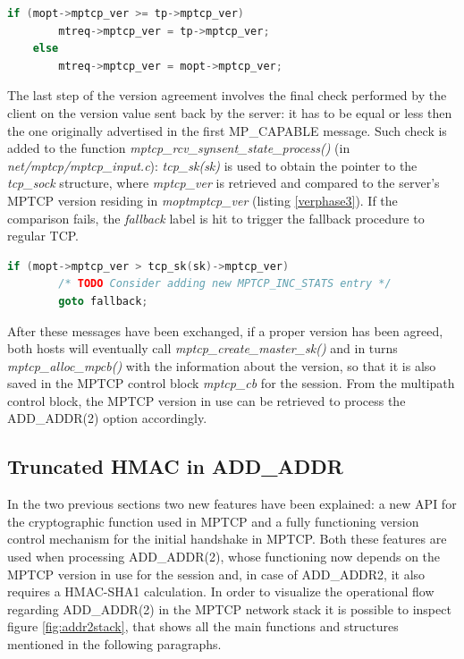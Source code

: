 \begin{lstlisting}[language=c, caption=MPTCP version agreement (phase 2), label=verphase2]
	if (mopt->mptcp_ver >= tp->mptcp_ver)
		mtreq->mptcp_ver = tp->mptcp_ver;
	else
		mtreq->mptcp_ver = mopt->mptcp_ver;
\end{lstlisting}

The last step of the version agreement involves the final check performed by the client on the version value sent back by the server: it has to be equal or less then the one originally advertised in the first MP\_CAPABLE message. Such check is added to the function \textit{mptcp\_rcv\_synsent\_state\_process()} (in \textit{net/mptcp/mptcp\_input.c}): \textit{tcp\_sk(sk)} is used to obtain the pointer to the \textit{tcp\_sock} structure, where \textit{mptcp\_ver} is retrieved and compared to the server's MPTCP version residing in \textit{mopt\textrightarrow mptcp\_ver} (listing \ref{verphase3}). If the comparison fails, the \textit{fallback} label is hit to trigger the fallback procedure to regular TCP.

\begin{lstlisting}[language=c, caption=MPTCP version agreement (phase 3), label=verphase3]
	if (mopt->mptcp_ver > tcp_sk(sk)->mptcp_ver)
		/* TODO Consider adding new MPTCP_INC_STATS entry */
		goto fallback;
\end{lstlisting}

After these messages have been exchanged, if a proper version has been agreed, both hosts will eventually call \textit{mptcp\_create\_master\_sk()} and in turns \textit{mptcp\_alloc\_mpcb()} with the information about the version, so that it is also saved in the MPTCP control block \textit{mptcp\_cb} for the session. From the multipath control block, the MPTCP version in use can be retrieved to process the ADD\_ADDR(2) option accordingly.

\subsection{Truncated HMAC in ADD\_ADDR}
\label{hmacinaddaddr}
In the two previous sections two new features have been explained: a new API for the cryptographic function used in MPTCP and a fully functioning version control mechanism for the initial handshake in MPTCP. Both these features are used when processing ADD\_ADDR(2), whose functioning now depends on the MPTCP version in use for the session and, in case of ADD\_ADDR2, it also requires a HMAC-SHA1 calculation.
In order to visualize the operational flow regarding ADD\_ADDR(2) in the MPTCP network stack it is possible to inspect figure \ref{fig:addr2stack}, that shows all the main functions and structures mentioned in the following paragraphs. 

